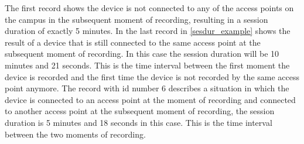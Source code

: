 The first record shows the device is not connected to any of the access points on the campus in the subsequent moment of recording, resulting in a session duration of exactly 5 minutes. In the last record in \autoref{sesdur_example} shows the result of a device that is still connected to the same access point at the subsequent moment of recording. In this case the session duration will be 10 minutes and 21 seconds. This is the time interval between the first moment the device is recorded and the first time the device is not recorded by the same access point anymore. The record with id number 6 describes a situation in which the device is connected to an access point at the moment of recording and connected to another access point at the subsequent moment of recording, the session duration is 5 minutes and 18 seconds in this case. This is the time interval between the two moments of recording.\\\\
